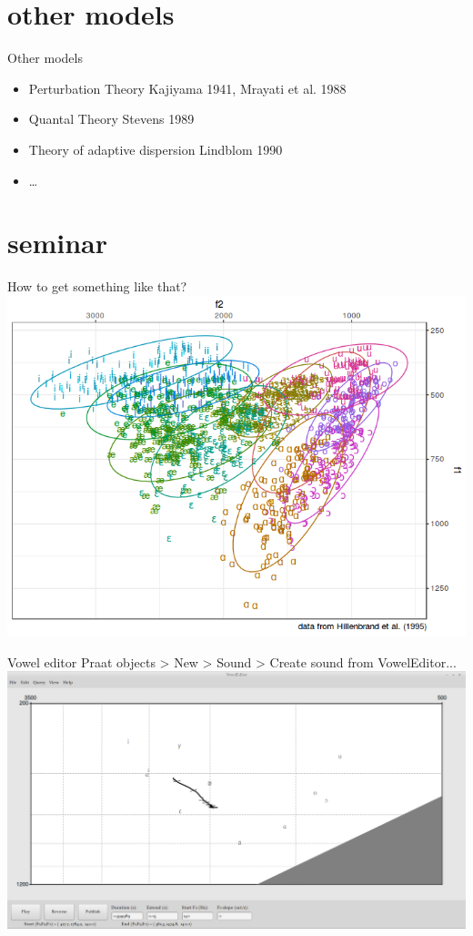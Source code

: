 \section{other models}
\begin{frame}{Other models}
\begin{itemize}
\item Perturbation Theory Kajiyama 1941, Mrayati et al. 1988
\item Quantal Theory Stevens 1989
\item Theory of adaptive dispersion Lindblom 1990
\item \dots
\end{itemize}
\end{frame}

\section{seminar}
\begin{frame}{How to get something like that?}
\includegraphics[width=\linewidth]{03-vowel-chart.png}
\end{frame}

\begin{frame}{Vowel editor}
Praat objects > New > Sound > Create sound from VowelEditor...
\includegraphics[width=\linewidth]{04-vowel-editor.png}
\end{frame}


